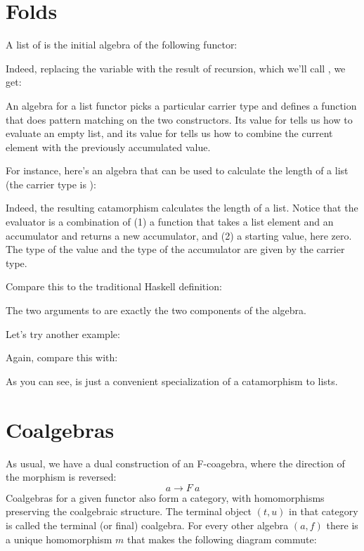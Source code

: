 \section{Folds}

A list of  is the initial algebra of the following functor:

Indeed, replacing the variable  with the result of recursion,
which we'll call , we get:

An algebra for a list functor picks a particular carrier type and
defines a function that does pattern matching on the two constructors.
Its value for  tells us how to evaluate an empty list, and
its value for  tells us how to combine the current element
with the previously accumulated value.

For instance, here's an algebra that can be used to calculate the length
of a list (the carrier type is ):

Indeed, the resulting catamorphism  calculates the
length of a list. Notice that the evaluator is a combination of (1) a
function that takes a list element and an accumulator and returns a new
accumulator, and (2) a starting value, here zero. The type of the value
and the type of the accumulator are given by the carrier type.

Compare this to the traditional Haskell definition:

The two arguments to  are exactly the two components of
the algebra.

Let's try another example:

Again, compare this with:

As you can see,  is just a convenient specialization of a
catamorphism to lists.

\section{Coalgebras}

As usual, we have a dual construction of an F-coagebra, where the
direction of the morphism is reversed:
\[a \to F\ a\]
Coalgebras for a given functor also form a category, with homomorphisms
preserving the coalgebraic structure. The terminal object
$(t, u)$ in that category is called the terminal (or final)
coalgebra. For every other algebra $(a, f)$ there is a unique
homomorphism $m$ that makes the following diagram commute:

